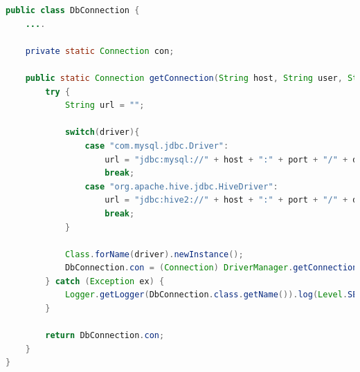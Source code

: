 \begin{lstlisting}[language=Java,basicstyle=\tiny,caption=DbConnection.java,label={lst:kode_bi_server_reporting_1}]
public class DbConnection {
	....
	
    private static Connection con;
    
    public static Connection getConnection(String host, String user, String pass, int port, String db, String driver){
        try {
            String url = "";

            switch(driver){
                case "com.mysql.jdbc.Driver":
                    url = "jdbc:mysql://" + host + ":" + port + "/" + db + "";
                    break;
                case "org.apache.hive.jdbc.HiveDriver":
                    url = "jdbc:hive2://" + host + ":" + port + "/" + db + "";
                    break;
            }

            Class.forName(driver).newInstance();
            DbConnection.con = (Connection) DriverManager.getConnection(url, user, pass);
        } catch (Exception ex) {
            Logger.getLogger(DbConnection.class.getName()).log(Level.SEVERE, null, ex);
        } 
        
        return DbConnection.con;
    }
}
\end{lstlisting}

